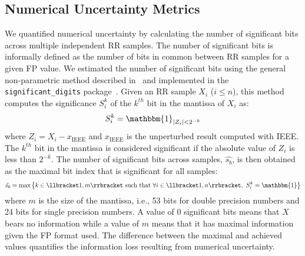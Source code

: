 \subsection{Numerical Uncertainty Metrics}


We quantified numerical uncertainty by calculating the number of significant bits across multiple independent RR samples. The number of significant bits is informally defined as the number of bits in common between RR samples for a given FP value. We estimated the number of significant bits using the general non-parametric method described in~\cite{sohier2021confidence} and implemented in the \texttt{significant\_digits} package~\cite{significantdigits-url}.
Given an RR sample $X_i$ ($i \leq n$), this method computes the significance  $S^k_i$ of the $k^{th}$ bit in the mantissa of $X_i$ as:
\[
S^k_i = \mathbbm{1}_{|Z_i |<2^{-k}}
\]
where $Z_i=X_i-x_\mathrm{IEEE}$ and $x_\mathrm{IEEE}$ is the unperturbed result computed with IEEE.
The $k^{th}$ bit in the mantissa is considered significant if the absolute value of $Z_i$ is less than $2^{-k}$. The number of significant bits across samples, $\hat{s_b}$, is then obtained as the maximal bit index that is significant for all samples:
\[\hat{s_{b}} = \textnormal{max} \left\{ k \in \llbracket 1, m \rrbracket \textnormal{ such that } \forall i \in \llbracket 1, n \rrbracket,\  S^{k}_{i}=\mathbbm{1}\right\} 
\]
where $m$ is the size of the mantissa, i.e., 53 bits for double precision numbers and 24 bits for single precision numbers.
A value of 0 significant bits means that $X$ bears no information while a value of $m$ means that it has maximal information given the FP format used.
The difference between the maximal and achieved values quantifies the information loss resulting from numerical uncertainty.

